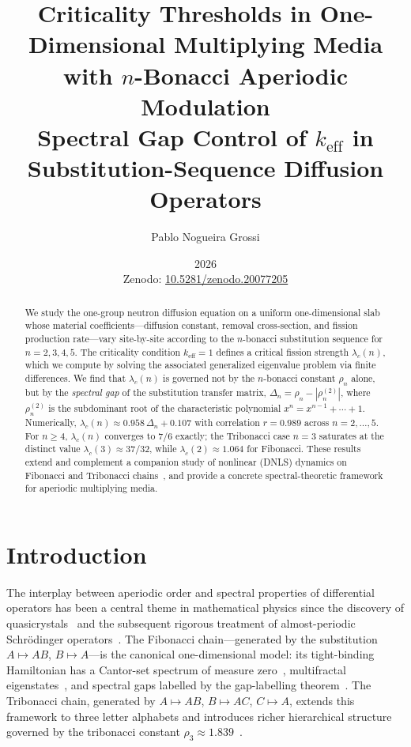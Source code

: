 \documentclass[11pt]{article}
\title{\textbf{Criticality Thresholds in One-Dimensional Multiplying Media
       with $n$-Bonacci Aperiodic Modulation}\\[6pt]
       {\large Spectral Gap Control of $k_{\mathrm{eff}}$ in
        Substitution-Sequence Diffusion Operators}}
\author[1]{Pablo Nogueira Grossi}
\affil[1]{G6 LLC, Newark, New Jersey, USA\\
          \texttt{g6llc@proton.me}\\
          ORCID: 0009-0000-6496-2186}
\date{2026\\[4pt]
\small Zenodo: \href{https://doi.org/10.5281/zenodo.20077205}{10.5281/zenodo.20077205}}
\newcommand{\keff}{k_{\mathrm{eff}}}
\newcommand{\lc}{\lambda_c}
\newcommand{\rhon}{\rho_n}
\begin{document}

\maketitle

\begin{abstract}
We study the one-group neutron diffusion equation on a uniform
one-dimensional slab whose material coefficients---diffusion constant,
removal cross-section, and fission production rate---vary site-by-site
according to the $n$-bonacci substitution sequence for
$n = 2, 3, 4, 5$.
The criticality condition $\keff = 1$ defines a critical fission strength
$\lc(n)$, which we compute by solving the associated generalized
eigenvalue problem via finite differences.
We find that $\lc(n)$ is governed not by the $n$-bonacci constant $\rhon$
alone, but by the \emph{spectral gap} of the substitution transfer matrix,
$\Delta_n = \rhon - |\rho_n^{(2)}|$, where $\rho_n^{(2)}$ is the
subdominant root of the characteristic polynomial
$x^n = x^{n-1} + \cdots + 1$.
Numerically, $\lc(n) \approx 0.958\,\Delta_n + 0.107$ with correlation
$r = 0.989$ across $n = 2, \ldots, 5$.
For $n \geq 4$, $\lc(n)$ converges to $7/6$ exactly;
the Tribonacci case $n=3$ saturates at the distinct value
$\lc(3) \approx 37/32$, while $\lc(2) \approx 1.064$ for Fibonacci.
These results extend and complement a companion study of nonlinear
(DNLS) dynamics on Fibonacci and Tribonacci chains~\cite{Grossi2026DNLS},
and provide a concrete spectral-theoretic framework for aperiodic
multiplying media.
\end{abstract}

\tableofcontents
\bigskip

\section{Introduction}
\label{sec:intro}

The interplay between aperiodic order and spectral properties of
differential operators has been a central theme in mathematical physics
since the discovery of quasicrystals~\cite{Shechtman1984} and the
subsequent rigorous treatment of almost-periodic Schr\"{o}dinger
operators~\cite{Bellissard1992,Damanik2017}.
The Fibonacci chain---generated by the substitution
$A \mapsto AB$, $B \mapsto A$---is the canonical one-dimensional model:
its tight-binding Hamiltonian has a Cantor-set spectrum of measure zero~\cite{Kohmoto1983,Ostlund1983,Luck1989},
multifractal eigenstates~\cite{Mace2016}, and spectral gaps labelled by the gap-labelling
theorem~\cite{Bellissard1992}.
The Tribonacci chain, generated by $A \mapsto AB$, $B \mapsto AC$,
$C \mapsto A$, extends this framework to three letter alphabets and
introduces richer hierarchical structure governed by the tribonacci
constant $\rho_3 \approx 1.839$~\cite{Krebbekx2023}.
\end{document}
